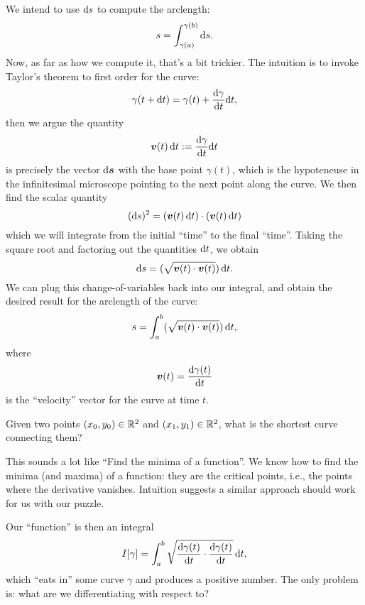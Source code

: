 We intend to use $\mathrm{d} s$ to compute the arclength:
\begin{equation}
s = \int^{\gamma(b)}_{\gamma(a)}\mathrm{d} s.
\end{equation}
Now, as far as how we compute it, that's a bit trickier. The intuition
is to invoke Taylor's theorem to first order for the curve:
\begin{equation}
\gamma(t+\mathrm{d} t) = \gamma(t) + \frac{\mathrm{d} \gamma}{\mathrm{d} t}\mathrm{d} t,
\end{equation}
then we argue the quantity 
\begin{equation}
\boldsymbol{v}(t)\,\mathrm{d} t := \frac{\mathrm{d} \gamma}{\mathrm{d} t}\mathrm{d} t
\end{equation}
is precisely the vector $\mathrm{d}\boldsymbol{s}$ with the base point $\gamma(t)$,
which is the hypoteneuse in the infinitesimal microscope pointing to the
next point along the curve. We then find the scalar quantity
\begin{equation}
(\mathrm{d} s)^{2} = (\boldsymbol{v}(t)\,\mathrm{d} t)\cdot(\boldsymbol{v}(t)\,\mathrm{d} t)
\end{equation}
which we will integrate from the initial ``time'' to the final
``time''. Taking the square root and factoring out the quantities $\mathrm{d} t$,
we obtain
\begin{equation}
\mathrm{d} s = (\sqrt{\boldsymbol{v}(t)\cdot\boldsymbol{v}(t)})\,\mathrm{d} t.
\end{equation}
We can plug this change-of-variables back into our integral, and obtain
the desired result for the arclength of the curve:
\begin{equation}
s = \int^{b}_{a}(\sqrt{\boldsymbol{v}(t)\cdot\boldsymbol{v}(t)})\,\mathrm{d} t,
\end{equation}
where
\begin{equation}
\boldsymbol{v}(t) = \frac{\mathrm{d}\gamma(t)}{\mathrm{d} t}
\end{equation}
is the ``velocity'' vector for the curve at time $t$.

Given two points $(x_{0},y_{0})\in\mathbb{R}^{2}$ and
$(x_{1},y_{1})\in\mathbb{R}^{2}$, what is the shortest curve connecting them?

This sounds a lot like ``Find the minima of a function''. We know how to
find the minima (and maxima) of a function: they are the critical
points, i.e., the points where the derivative vanishes. Intuition
suggests a similar approach should work for us with our puzzle.

Our ``function'' is then an integral
\begin{equation}\label{eq:introduction:arclength-functional}
I[\gamma] = \int^{b}_{a}\sqrt{\frac{\mathrm{d}\gamma(t)}{\mathrm{d} t}\cdot\frac{\mathrm{d}\gamma(t)}{\mathrm{d} t}}\,\mathrm{d} t,
\end{equation}
which ``eats in'' some curve $\gamma$ and produces a positive
number. The only problem is: what are we differentiating with respect
to?

